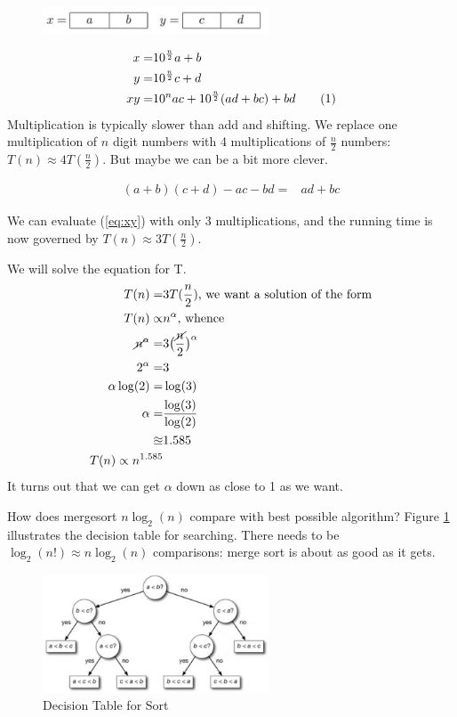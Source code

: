 \documentclass[]{article}
\newcommand\numberthis{\addtocounter{equation}{1}\tag{\theequation}}
\begin{document}
\begin{figure}[H]
\begin{center}
		\includegraphics[width=0.6\textwidth]{dc-mult}
	\end{center}
\end{figure}

\begin{align*}
	x=& 10^\frac{n}{2}a+b\\
	y =& 10^\frac{n}{2}c+d\\
	xy=& 10^n a c + 10^\frac{n}{2}(ad+bc) + bd \numberthis \label{eq:xy}
\end{align*}
Multiplication is typically slower than add and shifting. We replace one multiplication of $n$ digit numbers with 4 multiplications of $\frac{n}{2}$ numbers: $T(n) \approx 4T(\frac{n}{2})$. But maybe we can be a bit more clever.

\begin{align*}
	(a+b)(c+d) -ac -bd =& ad+bc 
\end{align*}

We can evaluate (\ref{eq:xy}) with only 3 multiplications, and the running time is now governed by $T(n) \approx 3T(\frac{n}{2})$.

We will solve the equation for T.
\begin{align*}
	T(n) =&3T(\frac{n}{2}) \text{, we want a solution of the form}\\
	T(n) \propto& n^\alpha \text{, whence}\\
	\cancel{n}^\alpha =& 3\big(\frac{\cancel{n}}{2}\big)^\alpha\\
	2^\alpha =& 3\\
	\alpha \log(2) =& \log(3)\\
	\alpha =& \frac{\log(3)}{\log(2)}\\
	\approxeq& 1.585\\
	T(n) \propto n^{1.585} 
\end{align*}
It turns out that we can get $\alpha$ down as close to 1 as we want.

How does mergesort $n \log_2(n)$ compare with best possible algorithm? Figure \ref{fig:dt-sort} illustrates the decision table for searching. There needs to be  $\log_2(n!) \approx n \log_2(n)$ comparisons: merge sort is about as good as it gets.

\begin{figure}[H]
	\begin{center}
		\caption{Decision Table for Sort}\label{fig:dt-sort}
		\includegraphics[width=0.6\textwidth]{dt-sort}
	\end{center}
\end{figure}
\end{document}
